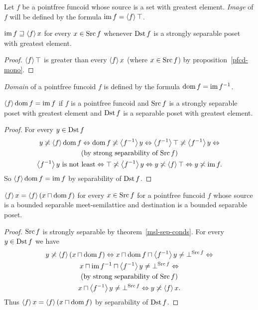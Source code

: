 \begin{defn}
Let $f$ be a pointfree funcoid whose
source is a set with greatest element. \emph{Image} of $f$ will be
defined by the formula $\operatorname{im} f=\left\langle f\right\rangle\top$.\end{defn}
\begin{prop}\label{pf-im-sub}
$\operatorname{im} f\sqsupseteq\left\langle f\right\rangle x$ for every $x\in\operatorname{Src} f$ whenever $\operatorname{Dst} f$
is a strongly separable poset with greatest element.\end{prop}
\begin{proof}
$\left\langle f\right\rangle\top$ is greater than every $\left\langle f\right\rangle x$ (where $x\in\operatorname{Src} f$)
by proposition~\ref{pfcd-mono}.\end{proof}
\begin{defn}
\emph{Domain} of a pointfree funcoid
$f$ is defined by the formula $\operatorname{dom} f=\operatorname{im} f^{-1}$.\end{defn}
\begin{prop}\label{f-dom-f}
$\left\langle f\right\rangle\operatorname{dom} f=\operatorname{im} f$ if $f$ is a pointfree funcoid and
$\operatorname{Src} f$ is a strongly separable poset with greatest element
and $\operatorname{Dst} f$ is a separable poset with greatest element.\end{prop}
\begin{proof}
For every $y\in\operatorname{Dst} f$
\begin{multline*}
y\not\asymp\left\langle f\right\rangle\operatorname{dom} f\Leftrightarrow\operatorname{dom} f\not\asymp\left\langle f^{-1}\right\rangle y\Leftrightarrow\left\langle f^{-1}\right\rangle\top\not\asymp\left\langle f^{-1}\right\rangle y\Leftrightarrow\\
\text{(by strong separability of $\operatorname{Src} f$)}\\
\left\langle f^{-1}\right\rangle y\text{ is not least}\Leftrightarrow\top\not\asymp\left\langle f^{-1}\right\rangle y\Leftrightarrow y\not\asymp\left\langle f\right\rangle\top\Leftrightarrow y\not\asymp\operatorname{im} f.
\end{multline*}
So $\left\langle f\right\rangle\operatorname{dom} f=\operatorname{im} f$ by separability of $\operatorname{Dst} f$.\end{proof}
\begin{prop}\label{pf-cap-dom}
$\left\langle f\right\rangle x=\left\langle f\right\rangle(x\sqcap\operatorname{dom} f)$
for every $x\in\operatorname{Src} f$ for a pointfree funcoid $f$ whose source
is a bounded separable meet-semilattice and destination is a bounded separable poset.\end{prop}
\begin{proof}
$\operatorname{Src} f$ is strongly separable by theorem~\ref{msl-sep-conds}.
For every $y\in\operatorname{Dst} f$ we have
\begin{multline*}
y\not\asymp\left\langle f\right\rangle(x\sqcap\operatorname{dom} f)\Leftrightarrow x\sqcap\operatorname{dom} f\sqcap\left\langle f^{-1}\right\rangle y\ne\bot^{\operatorname{Src} f}\Leftrightarrow\\
x\sqcap\operatorname{im} f^{-1}\sqcap\left\langle f^{-1}\right\rangle y\ne\bot^{\operatorname{Src} f}\Leftrightarrow\\
\text{(by strong separability of $\operatorname{Src} f$)}\\
x\sqcap\left\langle f^{-1}\right\rangle y\ne\bot^{\operatorname{Src} f}\Leftrightarrow y\not\asymp\left\langle f\right\rangle x.
\end{multline*}
Thus $\left\langle f\right\rangle x=\left\langle f\right\rangle(x\sqcap\operatorname{dom} f)$ by separability of $\operatorname{Dst} f$.\end{proof}
